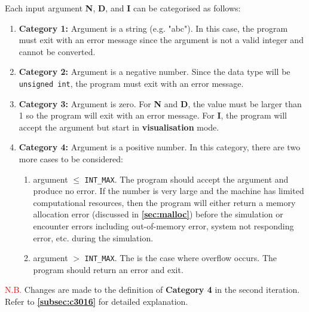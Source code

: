\documentclass[12pt, a4paper]{article}
\let\oldcref\cref
\renewcommand{\cref}[1]{\textbf{\oldcref{#1}}}
\begin{document}
Each input argument \textbf{N}, \textbf{D}, and \textbf{I} can be categorised as follows:
\begin{enumerate}
  \item \textbf{Category 1:} Argument is a string (e.g. "abc"). In this case, the program must
  exit with an error message since the argument is not a valid integer and cannot be converted.
  \item \textbf{Category 2:} Argument is a negative number. Since the data type will be
  \texttt{unsigned int}, the program must exit with an error message.
  \item \textbf{Category 3:} Argument is zero. For \textbf{N} and \textbf{D}, the value must be
  larger than 1 so the program will exit with an error message. For \textbf{I}, the program will
  accept the argument but start in \textbf{visualisation} mode.
  \item \textbf{Category 4:} Argument is a positive number. In this category, there are two more
  cases to be considered:
  \begin{enumerate}
    \item argument $\leq$ \texttt{INT_MAX}. The program should accept the argument and
    produce no error. If the number is very large and the machine has limited computational
    resources, then the program will either return a memory allocation error (discussed in
    \cref{sec:malloc}) before the simulation or encounter errors including out-of-memory error,
    system not responding error, etc. during the simulation.
    \item argument $>$ \texttt{INT_MAX}. The is the case where overflow occurs. The program
    should return an error and exit.
  \end{enumerate}
\end{enumerate}

\textcolor{red}{N.B.} Changes are made to the definition of \textbf{Category 4} in the second
iteration. Refer to \cref{subsec:c3016} for detailed explanation.
\end{document}
